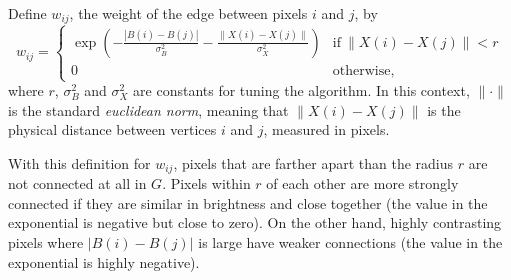 Define $w_{ij}$, the weight of the edge between pixels $i$ and $j$, by
\begin{equation}
\label{eq:imgseg-edge-weight}
w_{ij} = \begin{cases}
\exp\left(-\frac{|B(i) - B(j)|}{\sigma_B^2}-\frac{\|X(i) - X(j)\|}{\sigma_X^2}\right) & \text{if}\ \|X(i) - X(j)\| < r \\ 0 & \text{otherwise,}
\end{cases}
\end{equation}
where $r$, $\sigma_B^2$ and $\sigma_X^2$ are constants for tuning the algorithm.
In this context, $\|\cdot\|$ is the standard \emph{euclidean norm}, meaning that $\|X(i) - X(j)\|$ is the physical distance between vertices $i$ and $j$, measured in pixels.

With this definition for $w_{ij}$, pixels that are farther apart than the radius $r$ are not connected at all in $G$.
Pixels within $r$ of each other are more strongly connected if they are similar in brightness and close together (the value in the exponential is negative but close to zero).
On the other hand, highly contrasting pixels where $|B(i) - B(j)|$ is large have weaker connections (the value in the exponential is highly negative).

